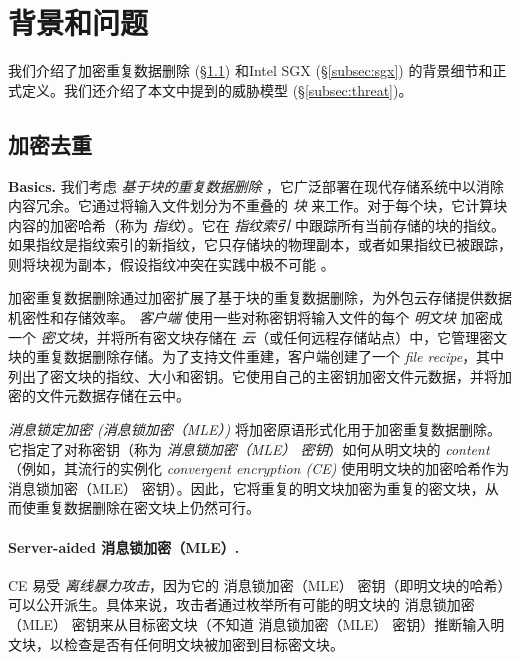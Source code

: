 \section{背景和问题}
\label{sec:background}

我们介绍了加密重复数据删除 (\S\ref{subsec:encrypted-dedup}) 和Intel SGX (\S\ref{subsec:sgx}) 的背景细节和正式定义。我们还介绍了本文中提到的威胁模型 (\S\ref{subsec:threat})。

\subsection{加密去重}
\label{subsec:encrypted-dedup}

\noindent
{\bf Basics.} 我们考虑 \textit{ 基于块的重复数据删除} \cite{zhu08,wallace12,meyer11}，它广泛部署在现代存储系统中以消除内容冗余。它通过将输入文件划分为不重叠的 \textit{ 块} 来工作。对于每个块，它计算块内容的加密哈希（称为 \textit{ 指纹}）。它在 \textit{ 指纹索引} 中跟踪所有当前存储的块的指纹。如果指纹是指纹索引的新指纹，它只存储块的物理副本，或者如果指纹已被跟踪，则将块视为副本，假设指纹冲突在实践中极不可能 \cite{black06}。
   
加密重复数据删除通过加密扩展了基于块的重复数据删除，为外包云存储提供数据机密性和存储效率。 \textit{ 客户端} 使用一些对称密钥将输入文件的每个 \textit{ 明文块} 加密成一个 \textit{ 密文块}，并将所有密文块存储在 \textit{ 云}（或任何远程存储站点）中，它管理密文块的重复数据删除存储。为了支持文件重建，客户端创建了一个 \textit{ file recipe}，其中列出了密文块的指纹、大小和密钥。它使用自己的主密钥加密文件元数据，并将加密的文件元数据存储在云中。

\textit{ 消息锁定加密 (消息锁加密（MLE）)} \cite{bellare13a} 将加密原语形式化用于加密重复数据删除。它指定了对称密钥（称为 \textit{ 消息锁加密（MLE） 密钥}）如何从明文块的 \textit{ content}（例如，其流行的实例化 \textit{ convergent encryption (CE)} \cite{douceur02}使用明文块的加密哈希作为 消息锁加密（MLE） 密钥）。因此，它将重复的明文块加密为重复的密文块，从而使重复数据删除在密文块上仍然可行。

\paragraph{Server-aided 消息锁加密（MLE）.} CE 易受 \textit{ 离线暴力攻击}，因为它的 消息锁加密（MLE） 密钥（即明文块的哈希）可以公开派生。具体来说，攻击者通过枚举所有可能的明文块的 消息锁加密（MLE） 密钥来从目标密文块（不知道 消息锁加密（MLE） 密钥）推断输入明文块，以检查是否有任何明文块被加密到目标密文块。

